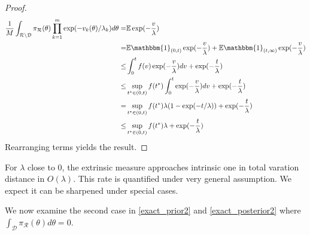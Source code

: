 \documentclass[10pt]{article}
\newcommand{\mc}[1]{\mathcal{#1}}
\DeclareMathOperator{\1}{\mathbbm{1}}
\begin{document}
\begin{proof}[Proof]
\begin{equation}
\begin{aligned}
\frac{1}{M}\int_{\mc R \setminus \mc D} {\pi_{\mc R}(\theta)} \prod_{k=1}^m \exp( -v_k(\theta)/\lambda_k) d \theta = & 
\mathbb{E} \exp(- \frac{v}{\lambda}) \\
= & \mathbb{E} \mathbbm{1}_{(0,t)} \exp(- \frac{v}{\lambda}) +  \mathbb{E} \mathbbm{1}_{(t,\infty)} \exp(- \frac{v}{\lambda}) \\
\le & \int_0^t f(v) \exp(- \frac{v}{\lambda}) dv + \exp(-\frac{t}{\lambda}) \\
\le & \sup_{t^*\in(0,t)} f(t^*) \int_0^t \exp(- \frac{v}{\lambda}) dv + \exp(-\frac{t}{\lambda}) \\
= & \sup_{t^*\in(0,t)} f(t^*)  \lambda (1- \exp(-t/\lambda)) + \exp(-\frac{t}{\lambda}) \\
\le  & \sup_{t^*\in(0,t)} f(t^*)  \lambda  + \exp(-\frac{t}{\lambda}) \\
\end{aligned}
\end{equation}
Rearranging terms yields the result.
\end{proof}

For $\lambda$ close to $0$, the extrinsic measure approaches intrinsic one in total varation distance in $O(\lambda)$. This rate is quantified under very general assumption. We expect it can be sharpened under special cases.

We now examine the second case in \eqref{exact_prior2} and \eqref{exact_posterior2} where ${ \int_{\mc D} \pi_{\mc R}(\theta)d\theta }=0$.
\end{document}

